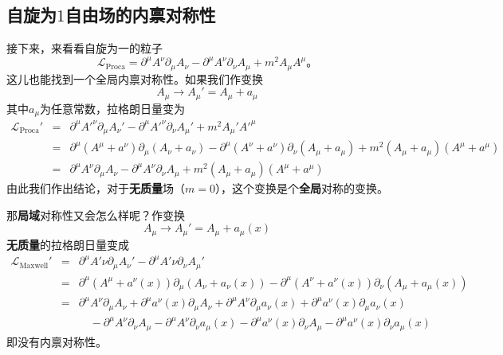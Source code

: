 \subsection{自旋为$1$自由场的内禀对称性}\label{sec7.1.2}
接下来，来看看自旋为一的粒子
\begin{equation}
{\mathscr L}_\text{Proca} = \partial^\mu A^\nu\partial_\mu A_\nu - \partial^\mu A^\nu \partial_\nu A_\mu + m^2A_\mu A^\mu \text{。}
\end{equation}
这儿也能找到一个全局内禀对称性。如果我们作变换
\begin{equation}
A_\mu \rightarrow A_\mu' = A_\mu+a_\mu
\end{equation}
其中$a_\mu$为任意常数，拉格朗日量变为
\begin{eqnarray}
{\mathscr L}_\text{Proca}' &=& \partial^\mu A'^\nu\partial_\mu A_\nu' - \partial^\mu A'^\nu \partial_\nu A_\mu' + m^2A_\mu' A'^\mu \nonumber\\
&=& \partial^\mu (A^\mu+a^\nu)\partial_\mu (A_\nu+a_\nu) - \partial^\mu (A^\nu+a^\nu) \partial_\nu ( A_\mu+a_\mu) + m^2( A_\mu+a_\mu) ( A^\mu+a^\mu) \nonumber\\
&=& \partial^\mu A^\nu\partial_\mu A_\nu - \partial^\mu A^\nu \partial_\nu A_\mu + m^2( A_\mu+a_\mu) ( A^\mu+a^\mu)
\end{eqnarray}
由此我们作出结论，对于{\bf 无质量}场（$m=0$），这个变换是个{\bf 全局}对称的变换。

那{\bf 局域}对称性又会怎么样呢？作变换
\begin{equation}
A_\mu \rightarrow A_\mu' = A_\mu+a_\mu(x)
\end{equation}
{\bf 无质量}的拉格朗日量变成
\begin{eqnarray}
{\mathscr L}_\text{Maxwell}' &=& \partial^\mu A'\nu\partial_\mu A_\nu' - \partial^\mu A'\nu \partial_\nu A_\mu' \nonumber\\
&=& \partial^\mu (A^\mu+a^\nu(x))\partial_\mu (A_\nu+a_\nu(x)) - \partial^\mu (A^\nu+a^\nu(x)) \partial_\nu ( A_\mu+a_\mu(x))  \nonumber\\
&=& \partial^\mu A^\nu\partial_\mu A_\nu+\partial^\mu a^\nu(x)\partial_\mu A_\nu+\partial^\mu A^\nu\partial_\mu a_\nu(x) +\partial^\mu a^\nu(x)\partial_\mu a_\nu(x) \nonumber\\
& &\quad - \partial^\mu A^\nu \partial_\nu A_\mu - \partial^\mu A^\nu \partial_\nu a_\mu(x)-\partial^\mu a^\nu(x) \partial_\nu A_\mu - \partial^\mu a^\nu(x) \partial_\nu a_\mu(x)
\end{eqnarray}
即没有内禀对称性。


